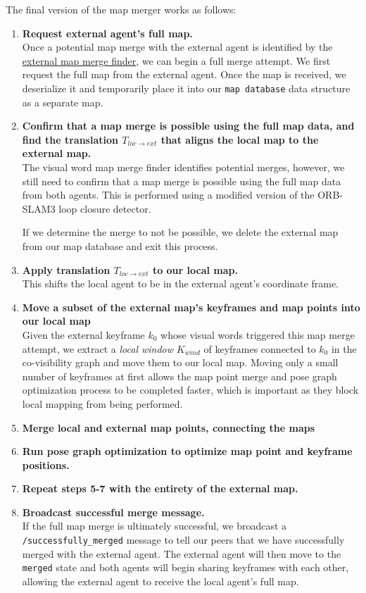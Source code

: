 The final version of the map merger works as follows:

\begin{enumerate}
    \item \textbf{Request external agent's full map.} \\
          Once a potential map merge with the external agent is identified by the \hyperref[sec:external-map-merge-finder]{external map merge finder}, we can begin a full merge attempt. We first request the full map from the external agent. Once the map is received, we deserialize it and temporarily place it into our \texttt{map database} data structure as a separate map.
    \item \textbf{Confirm that a map merge is possible using the full map data, and find the translation $T_{loc \rightarrow ext}$ that aligns the local map to the external map.} \\
          The visual word map merge finder identifies potential merges, however, we still need to confirm that a map merge is possible using the full map data from both agents. This is performed using a modified version of the ORB-SLAM3 loop closure detector.

          If we determine the merge to not be possible, we delete the external map from our map database and exit this process.
    \item \textbf{Apply translation $T_{loc \rightarrow ext}$ to our local map.} \\
          This shifts the local agent to be in the external agent's coordinate frame.
    \item \textbf{Move a subset of the external map's keyframes and map points into our local map} \\
          Given the external keyframe $k_0$ whose visual words triggered this map merge attempt, we extract a \textit{local window} $K_{wind}$ of keyframes connected to $k_0$ in the co-visibility graph and move them to our local map. Moving only a small number of keyframes at first allows the map point merge and pose graph optimization process to be completed faster, which is important as they block local mapping from being performed.
    \item \textbf{Merge local and external map points, connecting the maps}
    \item \textbf{Run pose graph optimization to optimize map point and keyframe positions.}
    \item \textbf{Repeat steps 5-7 with the entirety of the external map.}
    \item \textbf{Broadcast successful merge message.} \\
          If the full map merge is ultimately successful, we broadcast a \texttt{/successfully\_merged} message to tell our peers that we have successfully merged with the external agent. The external agent will then move to the \texttt{merged} state and both agents will begin sharing keyframes with each other, allowing the external agent to receive the local agent's full map.

\end{enumerate}

